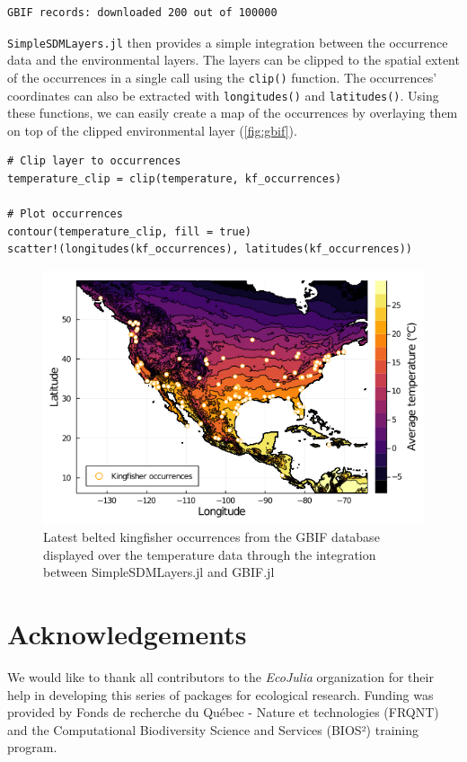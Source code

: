 \documentclass[
]{article}
\begin{document}
\begin{verbatim}
GBIF records: downloaded 200 out of 100000
\end{verbatim}

\texttt{SimpleSDMLayers.jl} then provides a simple
integration between the occurrence data and the environmental layers.
The layers can be clipped to the spatial extent of the occurrences in a
single call using the \texttt{clip()} function. The
occurrences' coordinates can also be extracted with
\texttt{longitudes()} and \texttt{latitudes()}.
Using these functions, we can easily create a map of the occurrences by
overlaying them on top of the clipped environmental layer
(\autoref{fig:gbif}).

\begin{verbatim}
# Clip layer to occurrences
temperature_clip = clip(temperature, kf_occurrences)

# Plot occurrences
contour(temperature_clip, fill = true)
scatter!(longitudes(kf_occurrences), latitudes(kf_occurrences))
\end{verbatim}

\begin{figure}
\centering
\includegraphics{figures/joss/paper_gbif_1.png}
\caption{Latest belted kingfisher occurrences from the GBIF database
displayed over the temperature data through the integration between
SimpleSDMLayers.jl and GBIF.jl\label{fig:gbif}}
\end{figure}

\hypertarget{acknowledgements}{%
\section{Acknowledgements}\label{acknowledgements}}

We would like to thank all contributors to the \emph{EcoJulia}
organization for their help in developing this series of packages for
ecological research. Funding was provided by Fonds de recherche du
Québec - Nature et technologies (FRQNT) and the Computational
Biodiversity Science and Services (BIOS²) training program.
\end{document}

